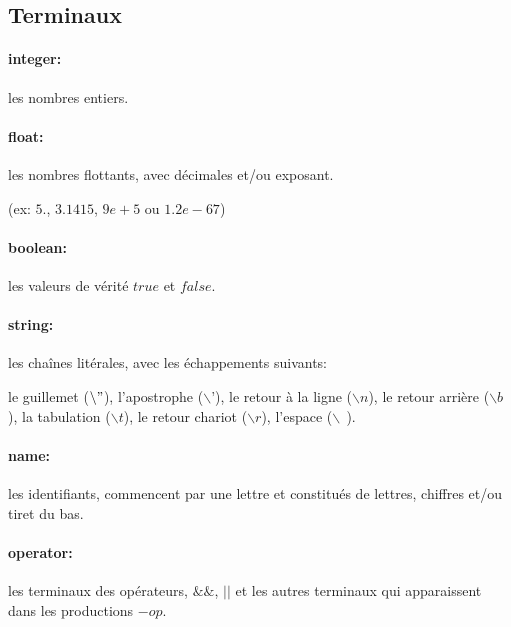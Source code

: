 \documentclass[paper=a4, fontsize=11pt]{scrartcl}
\numberwithin{equation}{section}		%
\numberwithin{figure}{section}			%
\numberwithin{table}{section}				%
\begin{document}
\subsection{Terminaux}

\paragraph{integer:} les nombres entiers.

\paragraph{float:} les nombres flottants, avec décimales et/ou exposant.
\begin{small}
(ex: $5.$, $3.1415$, $9e+5$ ou $1.2e-67$)
\end{small}

\paragraph{boolean:} les valeurs de vérité $true$ et $false$.

\paragraph{string:} les chaînes litérales, avec les échappements suivants: \\
\begin{small}
	le guillemet ($\backslash "$),
	l'apostrophe ($\backslash \textsf{'}$),
	le retour à la ligne ($\backslash n$),
	le retour arrière ($\backslash b$),
	la tabulation ($\backslash t$),
	le retour chariot ($\backslash r$),
	l'espace ($\backslash ~~$).
\end{small}

\paragraph{name:} les identifiants, commencent par une lettre et constitués de lettres, chiffres et/ou tiret du bas.

\paragraph{operator:} les terminaux des opérateurs, $\&\&$, $||$ et les autres terminaux qui apparaissent dans les productions $-op$.
\end{document}
